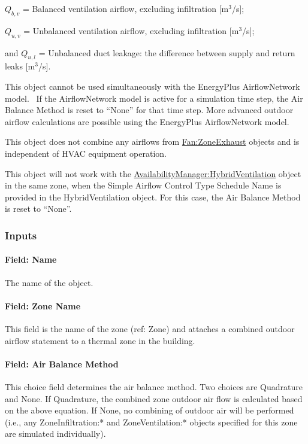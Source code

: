 $Q_{b,v}$ = Balanced ventilation airflow, excluding infiltration {[}m\(^{3}\)/s{]};

$Q_{u,v}$ = Unbalanced ventilation airflow, excluding infiltration {[}m\(^{3}\)/s{]};

and $Q_{u,l}$ = Unbalanced duct leakage: the difference between supply and return leaks {[}m\(^{3}\)/s{]}.

This object cannot be used simultaneously with the EnergyPlus AirflowNetwork model.~ If the AirflowNetwork model is active for a simulation time step, the Air Balance Method is reset to ``None'' for that time step. More advanced outdoor airflow calculations are possible using the EnergyPlus AirflowNetwork model.

This object does not combine any airflows from \hyperref[fanzoneexhaust]{Fan:ZoneExhaust} objects and is independent of HVAC equipment operation.

This object will not work with the \hyperref[availabilitymanagerhybridventilation]{AvailabilityManager:HybridVentilation} object in the same zone, when the Simple Airflow Control Type Schedule Name is provided in the HybridVentilation object. For this case, the Air Balance Method is reset to ``None''.

\subsubsection{Inputs}\label{inputs-4-004}

\paragraph{Field: Name}\label{field-name-4-004}

The name of the object.

\paragraph{Field: Zone Name}\label{field-zone-name-2}

This field is the name of the zone (ref: Zone) and attaches a combined outdoor airflow statement to a thermal zone in the building.

\paragraph{Field: Air Balance Method}\label{field-air-balance-method}

This choice field determines the air balance method. Two choices are Quadrature and None. If Quadrature, the combined zone outdoor air flow is calculated based on the above equation. If None, no combining of outdoor air will be performed (i.e., any ZoneInfiltration:* and ZoneVentilation:* objects specified for this zone are simulated individually).

